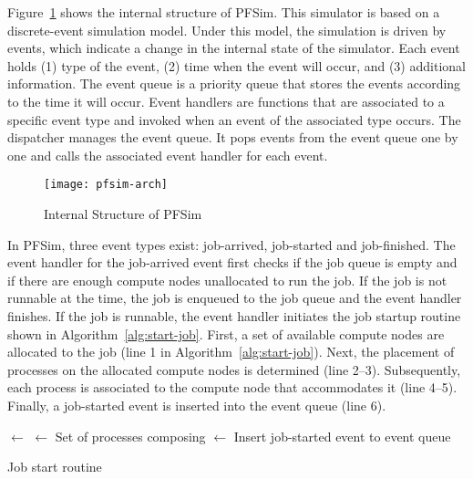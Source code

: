 Figure~\ref{fig:pfsim-arch} shows the internal structure of PFSim. This
simulator is based on a discrete-event simulation model. Under this model, the
simulation is driven by events, which indicate a change in the internal state
of the simulator. Each event holds (1) type of the event, (2) time when the
event will occur, and (3) additional information. The event queue is a
priority queue that stores the events according to the time it will occur.
Event handlers are functions that are associated to a specific event type and
invoked when an event of the associated type occurs. The dispatcher manages
the event queue. It pops events from the event queue one by one and calls the
associated event handler for each event.

\begin{figure}
    \centering
    \texttt{[image: pfsim-arch]}
    \caption{Internal Structure of PFSim}%
    \label{fig:pfsim-arch}
\end{figure}

In PFSim, three event types exist: job-arrived, job-started and job-finished.
The event handler for the job-arrived event first checks if the job queue is
empty and if there are enough compute nodes unallocated to run the job. If the
job is not runnable at the time, the job is enqueued to the job queue and the
event handler finishes. If the job is runnable, the event handler initiates
the job startup routine shown in Algorithm~\ref{alg:start-job}. First, a set
of available compute nodes are allocated to the job (line 1 in
Algorithm~\ref{alg:start-job}). Next, the placement of processes on the
allocated compute nodes is determined (line 2--3). Subsequently, each process
is associated to the compute node that accommodates it (line 4--5). Finally, a
job-started event is inserted into the event queue (line 6).

\begin{algorithm}

    \Nodes $\gets$ \allocateNodes{\Job}\;
    \Procs $\gets$ Set of processes composing \Job\;
    \Mapping $\gets$ \mapProcs{\Procs, \Nodes}\;
    Insert job-started event to event queue\;

    \caption{Job start routine}%
    \label{alg:start-job}
\end{algorithm}

